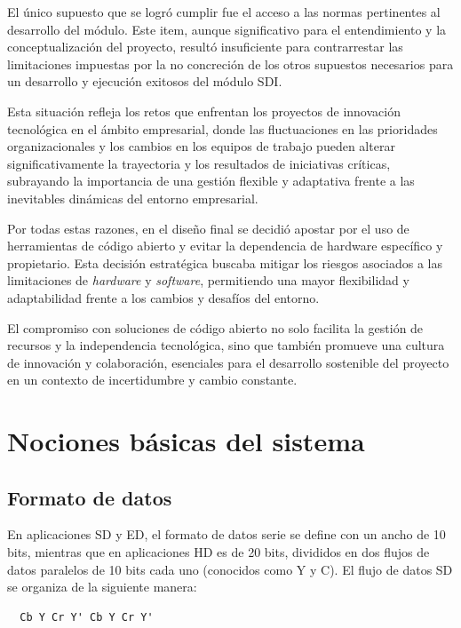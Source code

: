   El único supuesto que se logró cumplir fue el acceso a las normas pertinentes
  al desarrollo del módulo. Este item, aunque significativo para el entendimiento
  y la conceptualización del proyecto, resultó insuficiente para contrarrestar las
  limitaciones impuestas por la no concreción de los otros supuestos necesarios
  para un desarrollo y ejecución exitosos del módulo SDI\@.

  Esta situación refleja los retos que enfrentan los proyectos de innovación
  tecnológica en el ámbito empresarial, donde las fluctuaciones en las prioridades
  organizacionales y los cambios en los equipos de trabajo pueden alterar
  significativamente la trayectoria y los resultados de iniciativas críticas,
  subrayando la importancia de una gestión flexible y adaptativa frente a las
  inevitables dinámicas del entorno empresarial.

  Por todas estas razones, en el diseño final se decidió apostar por el uso de
  herramientas de código abierto y evitar la dependencia de hardware específico y
  propietario. Esta decisión estratégica buscaba mitigar los riesgos asociados a
  las limitaciones de \textit{hardware} y \textit{software}, permitiendo una
  mayor flexibilidad y adaptabilidad frente a los cambios y desafíos del entorno.

  El compromiso con soluciones de código abierto no solo facilita la gestión de
  recursos y la independencia tecnológica, sino que también promueve una cultura
  de innovación y colaboración, esenciales para el desarrollo sostenible del
  proyecto en un contexto de incertidumbre y cambio constante.

\section{Nociones básicas del sistema}

  \subsection{Formato de datos}

  En aplicaciones SD y ED, el formato de datos serie se define con un ancho de 10 bits,
  mientras que en aplicaciones HD es de 20 bits, divididos en dos flujos de datos paralelos
  de 10 bits cada uno (conocidos como Y y C). El flujo de datos SD se organiza de la
  siguiente manera:

  \begin{verbatim}
  Cb Y Cr Y' Cb Y Cr Y'
  \end{verbatim}

